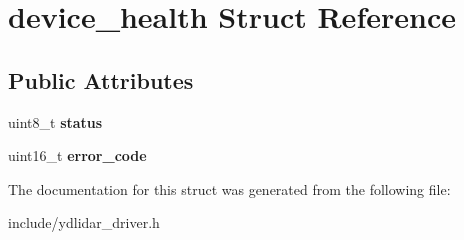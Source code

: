 \hypertarget{structdevice__health}{}\section{device\+\_\+health Struct Reference}
\label{structdevice__health}
\subsection*{Public Attributes}
\begin{DoxyCompactItemize}
\item 
uint8\+\_\+t {\bfseries status}\hypertarget{structdevice__health_ac3425f5555ecbb5a0da03b4cabe2777c}{}\label{structdevice__health_ac3425f5555ecbb5a0da03b4cabe2777c}

\item 
uint16\+\_\+t {\bfseries error\+\_\+code}\hypertarget{structdevice__health_a8815828d6de33cb43e8b72da48f51f23}{}\label{structdevice__health_a8815828d6de33cb43e8b72da48f51f23}

\end{DoxyCompactItemize}


The documentation for this struct was generated from the following file\+:\begin{DoxyCompactItemize}
\item 
include/ydlidar\+\_\+driver.\+h\end{DoxyCompactItemize}
